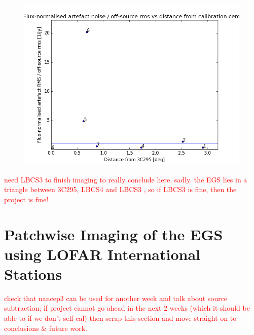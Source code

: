 \begin{figure}[h!]
\includegraphics[width=0.8\linewidth]{images/NormArtefactRMSvsDistFrom3c295.png}
\caption{}
\label{fig.rmsratio.distEGS}
\end{figure}

\pg
\textcolor{red}{need LBCS3 to finish imaging to really conclude here, sadly. the EGS lies in a triangle between 3C295, LBCS4 and LBCS3 , so if LBCS3 is fine, then the project is fine!}



\clearpage
\section{Patchwise Imaging of the EGS using LOFAR International Stations}

\pg
\textcolor{red}{check that nancep3 can be used for another week and talk about source subtraction; if project cannot go ahead in the next 2 weeks (which it should be able to if we don't self-cal) then scrap this section and move straight on to conclusions \& future work.}



